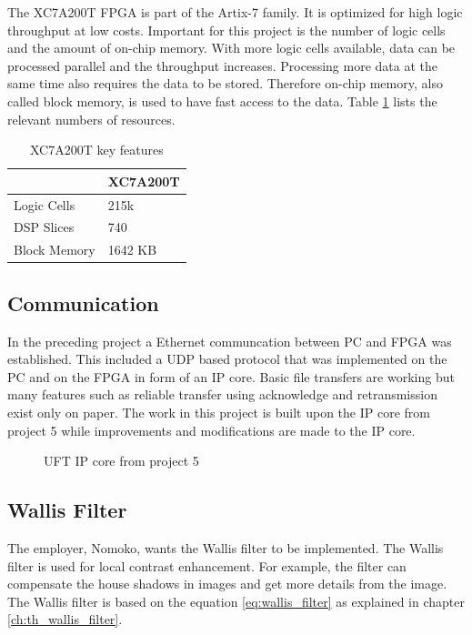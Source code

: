 The XC7A200T FPGA is part of the Artix-7 family. It is optimized for high logic
throughput at low costs. Important for this project is the number of logic cells
and the amount of on-chip memory. With more logic cells available, data can be
processed parallel and the throughput increases. Processing more data at the
same time also requires the data to be stored. Therefore on-chip memory, also
called block memory, is used to have fast access to the data. Table 
\ref{tab:XC7A200T} lists the relevant numbers of resources.

\begin{table}[tb!]
    \centering
    \begin{tabular}{l l}
        \toprule
         & XC7A200T \\
        \midrule
        Logic Cells & 215k \\
        DSP Slices & 740 \\
        Block Memory & 1642 KB \\
        \bottomrule
    \end{tabular}
    \caption{XC7A200T key features \cite{xilinx_ac701}}
    \label{tab:XC7A200T}
\end{table}


\subsection{Communication} \label{chapt:mission:communication} 
In the preceding project \cite{p5report} a Ethernet communcation between PC and
FPGA was established. This included a UDP based protocol that was implemented on
the PC and on the FPGA in form of an IP core. Basic file transfers are working
but many features such as reliable transfer using acknowledge and retransmission
exist only on paper. The work in this project is built
upon the IP core from project 5 while improvements and modifications are made to
the IP core.

\begin{figure}[tb!]
    \centering
    \caption{UFT IP core from project 5 \cite{p5report}}
    \label{fig:uftipcorep5}
\end{figure}


\subsection{Wallis Filter} \label{chapt:mission:wallis}
The employer, Nomoko, wants the Wallis filter to be implemented. The Wallis filter is used for local contrast enhancement. For example, the filter can compensate the house shadows in images and get more details from the image. 
The Wallis filter is based on the equation \ref{eq:wallis_filter} as explained in chapter \ref{ch:th_wallis_filter}.


